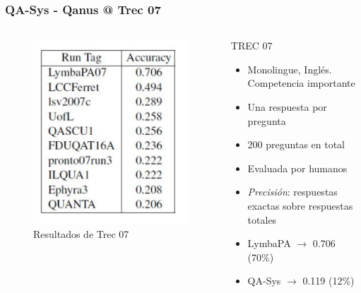 \begin{frame}[<+->]
\frametitle{QA-Sys - Qanus @ Trec 07}
\begin{columns}[T] %
\begin{column}{.48\textwidth}
  \begin{figure}
      \includegraphics[scale=0.5]{graficos/trec-7-accuracy-reduced}
    \caption{Resultados de Trec 07}
    \label{fig:tareas}
  \end{figure}
\end{column}%
\hfill%
\begin{column}{.48\textwidth}

  \begin{block}{TREC 07}
      \begin{itemize}
          \item Monolingue, Inglés. Competencia importante
          \item Una respuesta por pregunta
          \item 200 preguntas en total
          \item Evaluada por humanos
          \item \textit{Precisión}: respuestas exactas sobre respuestas totales
          \item LymbaPA $\rightarrow$ {\color{blue}0.706} (70\%)
          \item QA-Sys $\rightarrow$ {\color{blue}0.119} (12\%)
        \end{itemize}
  \end{block}
\end{column}%
\end{columns}

\end{frame}


